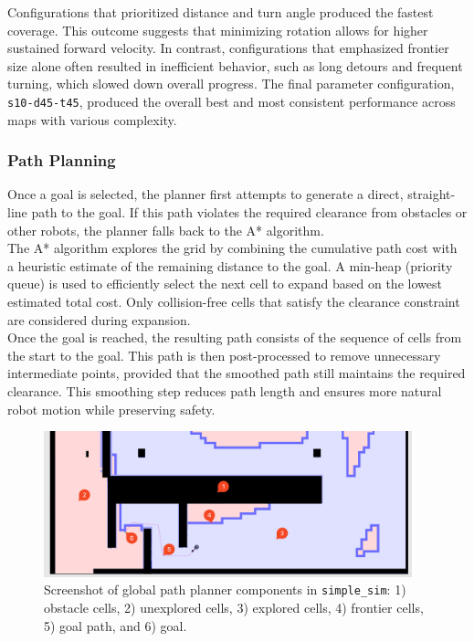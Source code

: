 Configurations that prioritized distance and turn angle produced the fastest coverage. This outcome suggests that minimizing rotation allows for higher sustained forward velocity. In contrast, configurations that emphasized frontier size alone often resulted in inefficient behavior, such as long detours and frequent turning, which slowed down overall progress. The final parameter configuration, \texttt{s10-d45-t45}, produced the overall best and most consistent performance across maps with various complexity.

\subsubsection{Path Planning}
\label{sec:path_planning}
Once a goal is selected, the planner first attempts to generate a direct, straight-line path to the goal. If this path violates the required clearance from obstacles or other robots, the planner falls back to the A* algorithm.\\

The A* algorithm explores the grid by combining the cumulative path cost with a heuristic estimate of the remaining distance to the goal. A min-heap (priority queue) is used to efficiently select the next cell to expand based on the lowest estimated total cost. Only collision-free cells that satisfy the clearance constraint are considered during expansion.\\

Once the goal is reached, the resulting path consists of the sequence of cells from the start to the goal. This path is then post-processed to remove unnecessary intermediate points, provided that the smoothed path still maintains the required clearance. This smoothing step reduces path length and ensures more natural robot motion while preserving safety.

\begin{figure}[H]
  \begin{center}
    \includegraphics[width=0.95\textwidth]{./figures/screenshots/path-planning-edit.png}
  \end{center}
  \caption{Screenshot of global path planner components in \texttt{simple\_sim}: 1) obstacle cells, 2) unexplored cells, 3) explored cells, 4) frontier cells, 5) goal path, and 6) goal.}
  \label{fig:path_planning}
\end{figure}


